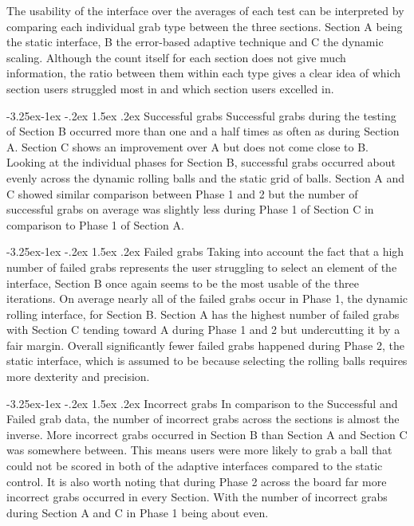 \documentclass[12pt]{article}
\makeatletter
\renewcommand{\subsubsection}{\@startsection{subsubsection}{2}{\z@}%
             {-3.25ex\@plus -1ex \@minus -.2ex}%
             {1.5ex \@plus .2ex}%
             {\normalfont\normalsize\scshape\bfseries}}
\makeatother
\begin{document}
The usability of the interface over the averages of each test can be interpreted by comparing each individual grab type between the three sections. Section A being the static interface, B the error-based adaptive technique and C the dynamic scaling. Although the count itself for each section does not give much information, the ratio between them within each type gives a clear idea of which section users struggled most in and which section users excelled in. 

\subsubsection{Successful grabs}
Successful grabs during the testing of Section B occurred more than one and a half times as often as during Section A. Section C shows an improvement over A but does not come close to B. Looking at the individual phases for Section B, successful grabs occurred about evenly across the dynamic rolling balls and the static grid of balls. Section A and C showed similar comparison between Phase 1 and 2 but the number of successful grabs on average was slightly less during Phase 1 of Section C in comparison to Phase 1 of Section A.  

\subsubsection{Failed grabs}
Taking into account the fact that a high number of failed grabs represents the user struggling to select an element of the interface, Section B once again seems to be the most usable of the three iterations. On average nearly all of the failed grabs occur in Phase 1, the dynamic rolling interface, for Section B. Section A has the highest number of failed grabs with Section C tending toward A during Phase 1 and 2 but undercutting it by a fair margin. Overall significantly fewer failed grabs happened during Phase 2, the static interface, which is assumed to be because selecting the rolling balls requires more dexterity and precision.

\subsubsection{Incorrect grabs}
In comparison to the Successful and Failed grab data, the number of incorrect grabs across the sections is almost the inverse. More incorrect grabs occurred in Section B than Section A and Section C was somewhere between. This means users were more likely to grab a ball that could not be scored in both of the adaptive interfaces compared to the static control. It is also worth noting that during Phase 2 across the board far more incorrect grabs occurred in every Section. With the number of incorrect grabs during Section A and C in Phase 1 being about even.
\end{document}
